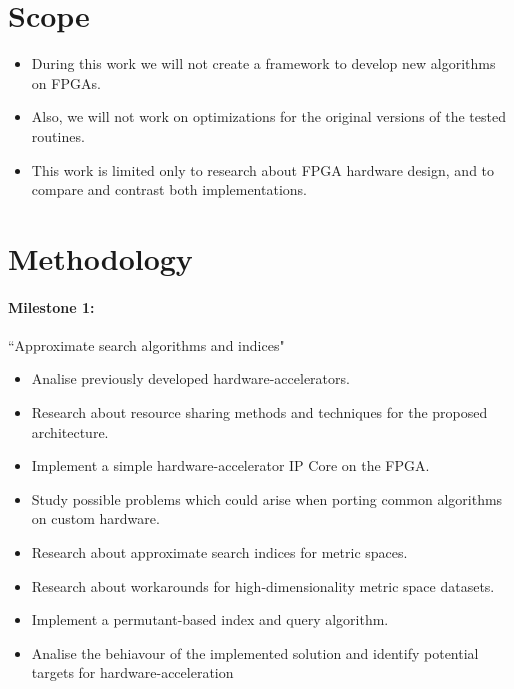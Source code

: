 \documentclass[11pt,letterpaper]{article}
\begin{document}
\section{Scope}
\begin{itemize}
    \item During this work we will not create a framework to develop new algorithms on FPGAs. 
    \item Also, we will not work on optimizations for the original versions of the tested routines.
    \item This work is limited only to research about FPGA hardware design, and to compare and contrast both 
        implementations.
\end{itemize}



\section{Methodology}


\paragraph{Milestone 1:} ``Approximate search algorithms and indices"
\begin{itemize}
    \item Analise previously developed hardware-accelerators.
    \item Research about resource sharing methods and techniques for the proposed architecture.
    \item Implement a simple hardware-accelerator IP Core on the FPGA.
    \item Study possible problems which could arise when porting common algorithms on custom hardware.
    \item Research about approximate search indices for metric spaces.
    \item Research about workarounds for high-dimensionality metric space datasets.
    \item Implement a permutant-based index and query algorithm.
    \item Analise the behiavour of the implemented solution and identify potential targets for hardware-acceleration
\end{itemize}
\end{document}
